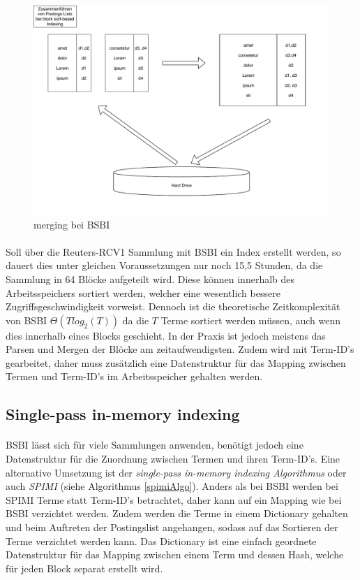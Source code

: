 \begin{figure}[ht]
  \includegraphics[width=\textwidth]{pdf/BSI_merging.pdf}
  \caption{merging bei BSBI}
  \label{bsiMerging}
\end{figure}

\paragraph{}
Soll über die Reuters-RCV1 Sammlung mit BSBI ein Index erstellt werden, so dauert dies unter gleichen Voraussetzungen nur noch 15,5 Stunden, da die Sammlung in 64 Blöcke aufgeteilt wird. Diese können innerhalb des Arbeitsspeichers sortiert werden, welcher eine wesentlich bessere Zugriffsgeschwindigkeit vorweist. Dennoch ist die theoretische Zeitkomplexität von BSBI $\Theta( T log_2 ( T))$ da die $T$ Terme sortiert werden müssen, auch wenn dies innerhalb eines Blocks geschieht. In der Praxis ist jedoch meistens das Parsen und Mergen der Blöcke am zeitaufwendigsten. Zudem wird mit Term-ID's gearbeitet,  daher muss zusätzlich eine Datenstruktur für das Mapping zwischen Termen und Term-ID's im Arbeitsspeicher gehalten werden.\par

\subsection{Single-pass in-memory indexing}
\paragraph{}
BSBI lässt sich für viele Sammlungen anwenden, benötigt jedoch eine Datenstruktur für die Zuordnung zwischen Termen und ihren Term-ID's. Eine alternative Umsetzung ist der \textit{single-pass in-memory indexing Algorithmus} oder auch \textit{SPIMI} (siehe Algorithmus \ref{spimiAlgo}). Anders als bei BSBI werden bei SPIMI Terme statt Term-ID's betrachtet, daher kann auf ein Mapping wie bei BSBI verzichtet werden. Zudem werden die Terme in einem Dictionary gehalten und beim Auftreten der Postingslist angehangen, sodass auf das Sortieren der Terme verzichtet werden kann. Das Dictionary ist eine einfach geordnete Datenstruktur für das Mapping zwischen einem Term und dessen Hash, welche für jeden Block separat erstellt wird.\par


